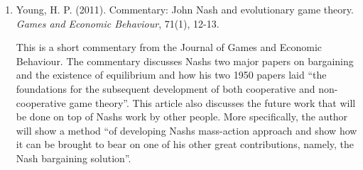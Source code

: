 \documentclass[11pt]{article}
\begin{document}
\begin{enumerate}
\item Young, H. P. (2011). Commentary: John Nash and evolutionary game theory. \textit{Games and Economic Behaviour}, 71(1), 12-13.

This is a short commentary from the Journal of Games and Economic Behaviour. The commentary discusses Nash\textsc{}s two major papers on bargaining and the existence of equilibrium and how his two 1950 papers laid ``the foundations for the subsequent development of both cooperative and non-cooperative game theory''. This article also discusses the future work that will be done on top of Nash\textsc{}s work by other people. More specifically, the author will show a method ``of developing Nash\textsc{}s mass-action approach and show how it can be brought to bear on one of his other great contributions, namely, the Nash bargaining solution''.
\end{enumerate}
\end{document}
